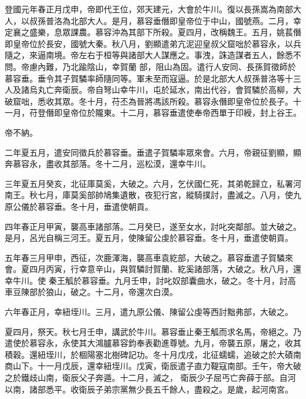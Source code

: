 \begin{pinyinscope}
 登國元年春正月戊申，帝即代王位，郊天建元，大會於牛川。復以長孫嵩為南部大人，以叔孫普洛為北部大人。是月，慕容垂僭即皇帝位于中山，國號燕。二月，幸定襄之盛樂，息眾課農。慕容沖為其部下所殺。夏四月，改稱魏王。五月，姚萇僭即皇帝位於長安，國號大秦。秋八月，劉顯遣弟亢泥迎皇叔父窟咄於慕容永，以兵隨之，來逼南境。帝左右于桓等與諸部大人謀應之。事洩，誅造謀者五人，餘悉不問。帝慮內難，乃北踰陰山，幸賀蘭
 部，阻山為固。遣行人安同、長孫賀徵師於慕容垂。垂令其子賀驎率師隨同等。軍未至而寇逼。於是北部大人叔孫普洛等十三人及諸烏丸亡奔衛辰。帝自弩山幸牛川，屯於延水，南出代谷，會賀驎於高柳，大破窟咄，悉收其眾。冬十月，苻丕為晉將馮該所殺。慕容永僭即皇帝位於長子。十一月，苻登僭即皇帝位於隴東。十二月，慕容垂遣使奉帝西單于印綬，封上谷王。



 帝不納。



 二年夏五月，遣安同徵兵於慕容垂。垂遣子賀驎率眾來會。六月，帝親征劉顯，顯奔慕容永，盡收其部落。冬十二月，巡松漠，還幸牛川。



 三年夏五月癸亥，北征庫莫奚，大破之。六月，乞伏國仁死，其弟乾歸立，私署河南王。秋七月，庫莫奚部帥鳩集遺散，夜犯行宮，縱騎撲討，盡滅之。八月，使九原公儀於慕容垂。冬十月，垂遣使朝貢。



 四年春正月甲寅，襲高車諸部落。二月癸巳，遂至女水，討叱突鄰部。並大破之。是月，呂光自稱三河王。夏五月，使陳留公虔於慕容垂。冬十月，垂遣使朝貢。



 五年春三月甲申，西征，次鹿渾海，襲高車袁紇部，大破之。慕容垂遣子賀驎來會。夏四月丙寅，行幸意辛山，與賀驎討賀蘭、紇奚諸部落，大破之。秋八月，還幸牛川。使
 秦王觚於慕容垂。九月壬申，討叱奴部囊曲水，破之。冬十月，討高車豆陳部於狼山，破之。十二月，帝還次白漠。



 六年春正月，幸紐垤川。三月，遣九原公儀、陳留公虔等西討黜弗部，大破之。



 夏四月，祭天。秋七月壬申，講武於牛川。慕容垂止秦王觚而求名馬，帝絕之。乃遣使於慕容永，永使其大鴻臚慕容鈞奉表勸進尊號。九月，帝襲五原，屠之，收其積穀。還紐垤川，於棝陽塞北樹碑記功。冬十月戊戌，北征蠕蠕，追破之於大磧南商山下。十一月戊辰，還幸紐垤川。戊寅，衛辰遣子直力鞮寇南部。壬午，帝大破之於鐵歧山南，衛辰父子奔遁。十二月，滅之，
 衛辰少子屈丐亡奔薛于部。自河以南，諸部悉平。收衛辰子弟宗黨無少長五千餘人，盡殺之。是歲，起河南宮。




\end{pinyinscope}
